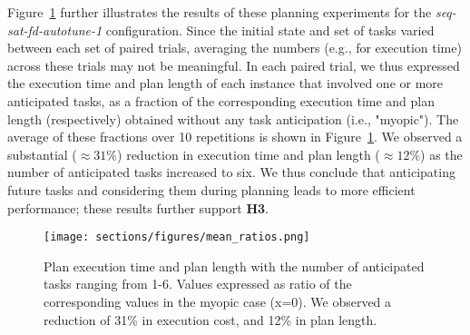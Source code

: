 \vspace{-1em}
Figure~\ref{fig:trend} further illustrates the results of these planning experiments for the \textit{seq-sat-fd-autotune-1} configuration. Since the initial state and set of tasks varied between each set of paired trials, averaging the numbers (e.g., for execution time) across these trials may not be meaningful. In each paired trial, we thus expressed the execution time and plan length of each instance that involved one or more anticipated tasks, as a fraction of the corresponding execution time and plan length (respectively) obtained without any task anticipation (i.e., "myopic"). The average of these fractions over 10 repetitions is shown in Figure~\ref{fig:trend}. We observed a substantial ($\approx 31\%$) reduction in execution time and plan length ($\approx 12\%$) as the number of anticipated tasks increased to six. We thus conclude that anticipating future tasks and considering them during planning leads to more efficient performance; these results further support \textbf{H3}.
\begin{figure}
    \centering
    \footnotesize{
        \texttt{[image: sections/figures/mean\_ratios.png]}
    
    \setlength{\belowcaptionskip}{-15pt}
    \caption{Plan execution time and plan length with the number of anticipated tasks ranging from 1-6. Values expressed as ratio of the corresponding values in the myopic case (x=0). We observed a reduction of 31\% in execution cost, and 12\% in plan length.}
    \label{fig:trend}
    }
\end{figure}


